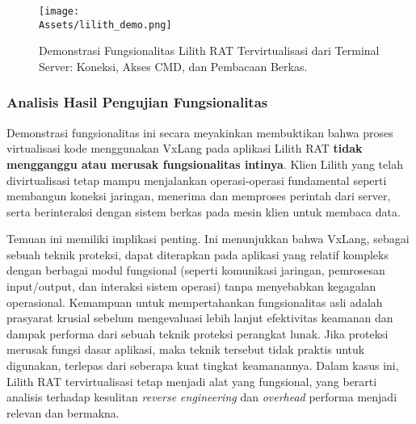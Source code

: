 \begin{figure}[H]
    \centering
    \texttt{[image: \\Assets/lilith\_demo.png]} 
    \caption{Demonstrasi Fungsionalitas Lilith RAT Tervirtualisasi dari Terminal Server: Koneksi, Akses CMD, dan Pembacaan Berkas.}
    \label{fig:lilith_demo_terminal_fungsionalitas}
\end{figure}

\subsubsection{Analisis Hasil Pengujian Fungsionalitas}
Demonstrasi fungsionalitas ini secara meyakinkan membuktikan bahwa proses virtualisasi kode menggunakan VxLang pada aplikasi Lilith RAT \textbf{tidak mengganggu atau merusak fungsionalitas intinya}. Klien Lilith yang telah divirtualisasi tetap mampu menjalankan operasi-operasi fundamental seperti membangun koneksi jaringan, menerima dan memproses perintah dari server, serta berinteraksi dengan sistem berkas pada mesin klien untuk membaca data.

Temuan ini memiliki implikasi penting. Ini menunjukkan bahwa VxLang, sebagai sebuah teknik proteksi, dapat diterapkan pada aplikasi yang relatif kompleks dengan berbagai modul fungsional (seperti komunikasi jaringan, pemrosesan input/output, dan interaksi sistem operasi) tanpa menyebabkan kegagalan operasional. Kemampuan untuk mempertahankan fungsionalitas asli adalah prasyarat krusial sebelum mengevaluasi lebih lanjut efektivitas keamanan dan dampak performa dari sebuah teknik proteksi perangkat lunak. Jika proteksi merusak fungsi dasar aplikasi, maka teknik tersebut tidak praktis untuk digunakan, terlepas dari seberapa kuat tingkat keamanannya. Dalam kasus ini, Lilith RAT tervirtualisasi tetap menjadi alat yang fungsional, yang berarti analisis terhadap kesulitan \textit{reverse engineering} dan \textit{overhead} performa menjadi relevan dan bermakna.

